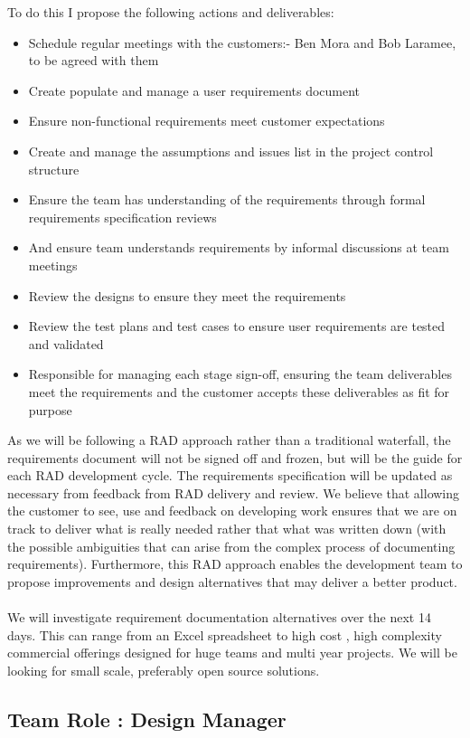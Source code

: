 \documentclass{article}
\begin{document}
To do this I propose the following actions and deliverables:
\begin{itemize}
\item Schedule regular meetings with the customers:- Ben Mora and Bob Laramee, to be agreed with them
\item Create populate and manage a user requirements document
\item Ensure non-functional requirements meet customer expectations
\item Create and manage the assumptions and issues list in the project control structure
\item Ensure the team has understanding of the requirements through formal requirements specification reviews
\item And ensure team understands requirements by informal discussions at team meetings
\item Review the designs to ensure they meet the requirements
\item Review the test plans and test cases to ensure user requirements are tested and validated
\item Responsible for managing each stage sign-off, ensuring the team deliverables meet the requirements and the customer accepts these deliverables as fit for purpose
\end{itemize}
As we will be following a RAD approach rather than a traditional waterfall, the requirements document will not be signed off and frozen, but will be the guide for each RAD development cycle. The requirements specification will be updated as necessary from feedback from RAD delivery and review. We believe that allowing the customer to see, use and feedback on developing work ensures that we are on track to deliver what is really needed rather that what was written down (with the possible ambiguities that can arise from the complex process of documenting requirements). Furthermore, this RAD approach enables the development team to propose improvements and design alternatives that may deliver a better product.
\\
\\
We will investigate  requirement documentation alternatives over the next 14 days. This can range from an Excel spreadsheet to high cost , high complexity commercial offerings designed for huge teams and multi year projects. We will be looking for small scale, preferably open source solutions. 

\subsection{Team Role : Design Manager}
\end{document}

